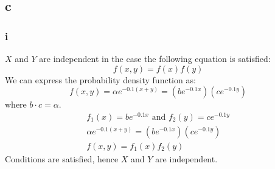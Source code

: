 \documentclass[11pt]{article}
\numberwithin{equation}{section}
\begin{document}
\subsection{c}
\subsubsection{i}
$X$ and $Y$ are independent in the case the following equation is satisfied:
\begin{equation}
    f(x,y) = f(x) f(y)
\end{equation}
We can express the probability density function as:
\begin{equation}
    f(x,y) = \alpha e^{-0.1\left(x+y\right)} = \left(be^{-0.1x}\right)\left(ce^{-0.1y}\right)
\end{equation}
where $b\cdot c = \alpha$.
\begin{gather}
    f_1(x) = be^{-0.1x} \textrm{ and } f_2(y) = ce^{-0.1y}\\
    \alpha e^{-0.1\left(x+y\right)} = \left(be^{-0.1x}\right)\left(ce^{-0.1y}\right)\\
    f(x,y) = f_1(x)f_2(y)
\end{gather}
Conditions are satisfied, hence $X$ and $Y$ are independent.
\end{document}
